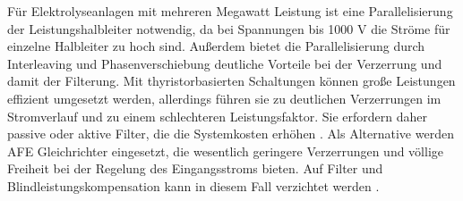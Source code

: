 		Für Elektrolyseanlagen mit mehreren Megawatt Leistung ist eine Parallelisierung der Leistungshalbleiter notwendig, da bei Spannungen bis 1000 V die Ströme für einzelne Halbleiter zu hoch sind. Außerdem bietet die Parallelisierung durch Interleaving und Phasenverschiebung deutliche Vorteile bei der Verzerrung und damit der Filterung. Mit thyristorbasierten Schaltungen können große Leistungen effizient umgesetzt werden, allerdings führen sie zu deutlichen Verzerrungen im Stromverlauf und zu einem schlechteren Leistungsfaktor. Sie erfordern daher passive oder aktive Filter, die die Systemkosten erhöhen \cite{HydrogenElectronicTopologies}.
		Als Alternative werden \gls{AFE} Gleichrichter eingesetzt, die wesentlich geringere Verzerrungen und völlige Freiheit bei der Regelung des Eingangsstroms bieten. Auf Filter und Blindleistungskompensation kann in diesem Fall verzichtet werden \cite{HydrogenElectronicTopologies}.
		
